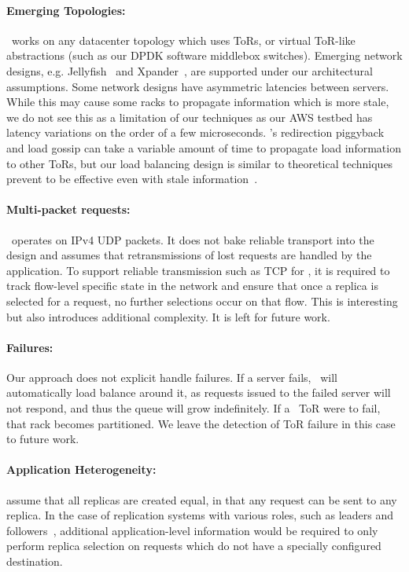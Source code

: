 \paragraph{Emerging Topologies:} \daronpon\ works on any datacenter topology
which uses ToRs, or virtual ToR-like abstractions (such as our DPDK software
middlebox switches). Emerging network designs, e.g. Jellyfish~\cite{jellyfish}
and Xpander~\cite{xpander}, are supported under our architectural assumptions.
Some network designs have asymmetric latencies between servers.  While this may
cause some racks to propagate information which is more stale, we do not see
this as a limitation of our techniques as our AWS testbed has latency variations
on the order of a few microseconds.  \daronpon's redirection piggyback and load
gossip can take a variable amount of time to propagate load information to
other ToRs, but our load balancing design is similar to theoretical techniques
prevent to be effective even with stale information~\cite{lsq}. 

\paragraph{Multi-packet requests:} \daronpon\ operates on IPv4 UDP packets. It 
does not bake reliable transport into the design and assumes that
retransmissions of lost requests are handled by the application. To support
reliable transmission such as TCP for \daronpon, it is required to track flow-level specific state in the network and ensure that once a replica is selected for a request, no further selections occur on that flow. This is interesting but also introduces additional complexity. It is left for future work.

\paragraph{Failures:} Our approach does not explicit handle failures. If a
server fails, \daronpon\ will automatically load balance around it, as requests
issued to the failed server will not respond, and thus the queue will grow
indefinitely. If a \daronpon\ ToR were to fail, that rack becomes partitioned.
We leave the detection of ToR failure in this case to future work.

\paragraph{Application Heterogeneity:} \daronpon assume that all replicas are
created equal, in that any request can be sent to any replica. In the case of
replication systems with various roles, such as leaders and
followers~\cite{raft}, additional application-level information would be
required to only perform replica selection on requests which do not have a
specially configured destination.


